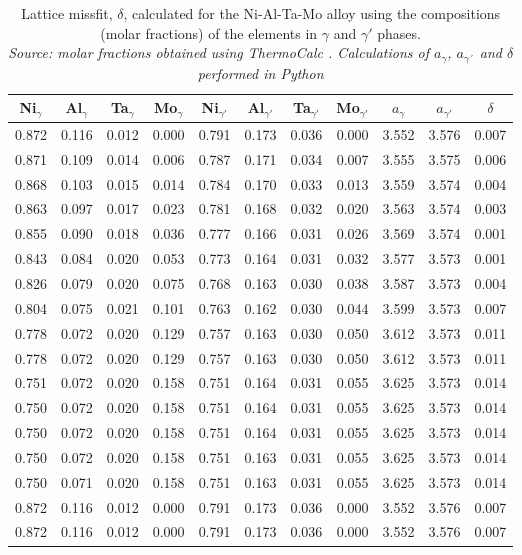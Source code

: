 \begin{table}[H]
    \centering
    \begin{tabular}{rrrrrrrrrrr}
        \multicolumn{1}{c}{Ni$_\gamma$} & \multicolumn{1}{c}{Al$_\gamma$} & \multicolumn{1}{c}{Ta$_\gamma$} & \multicolumn{1}{c}{Mo$_\gamma$} & \multicolumn{1}{c}{Ni$_{\gamma'}$} & \multicolumn{1}{c}{Al$_{\gamma'}$} & \multicolumn{1}{c}{Ta$_{\gamma'}$} & \multicolumn{1}{c}{Mo$_{\gamma'}$} & \multicolumn{1}{c}{$a_\gamma$} & \multicolumn{1}{c}{$a_{\gamma'}$} & \multicolumn{1}{c}{$\delta$} \\ \hline \hline
        0.872 & 0.116 & 0.012 & 0.000 & 0.791 & 0.173 & 0.036 & 0.000 & 3.552 & 3.576 & 0.007 \\0.871 & 0.109 & 0.014 & 0.006 & 0.787 & 0.171 & 0.034 & 0.007 & 3.555 & 3.575 & 0.006 \\0.868 & 0.103 & 0.015 & 0.014 & 0.784 & 0.170 & 0.033 & 0.013 & 3.559 & 3.574 & 0.004 \\0.863 & 0.097 & 0.017 & 0.023 & 0.781 & 0.168 & 0.032 & 0.020 & 3.563 & 3.574 & 0.003 \\0.855 & 0.090 & 0.018 & 0.036 & 0.777 & 0.166 & 0.031 & 0.026 & 3.569 & 3.574 & 0.001 \\0.843 & 0.084 & 0.020 & 0.053 & 0.773 & 0.164 & 0.031 & 0.032 & 3.577 & 3.573 & 0.001 \\0.826 & 0.079 & 0.020 & 0.075 & 0.768 & 0.163 & 0.030 & 0.038 & 3.587 & 3.573 & 0.004 \\0.804 & 0.075 & 0.021 & 0.101 & 0.763 & 0.162 & 0.030 & 0.044 & 3.599 & 3.573 & 0.007 \\0.778 & 0.072 & 0.020 & 0.129 & 0.757 & 0.163 & 0.030 & 0.050 & 3.612 & 3.573 & 0.011 \\0.778 & 0.072 & 0.020 & 0.129 & 0.757 & 0.163 & 0.030 & 0.050 & 3.612 & 3.573 & 0.011 \\0.751 & 0.072 & 0.020 & 0.158 & 0.751 & 0.164 & 0.031 & 0.055 & 3.625 & 3.573 & 0.014 \\0.750 & 0.072 & 0.020 & 0.158 & 0.751 & 0.164 & 0.031 & 0.055 & 3.625 & 3.573 & 0.014 \\0.750 & 0.072 & 0.020 & 0.158 & 0.751 & 0.164 & 0.031 & 0.055 & 3.625 & 3.573 & 0.014 \\0.750 & 0.072 & 0.020 & 0.158 & 0.751 & 0.163 & 0.031 & 0.055 & 3.625 & 3.573 & 0.014 \\0.750 & 0.071 & 0.020 & 0.158 & 0.751 & 0.163 & 0.031 & 0.055 & 3.625 & 3.573 & 0.014 \\0.872 & 0.116 & 0.012 & 0.000 & 0.791 & 0.173 & 0.036 & 0.000 & 3.552 & 3.576 & 0.007 \\0.872 & 0.116 & 0.012 & 0.000 & 0.791 & 0.173 & 0.036 & 0.000 & 3.552 & 3.576 & 0.007
    \end{tabular}
    \caption{\centering Lattice missfit, $\delta$, calculated for the Ni-Al-Ta-Mo alloy using the compositions (molar fractions) of the elements in $\gamma$ and $\gamma'$ phases.\\
    \textit{Source: molar fractions obtained using ThermoCalc \citep{thermocalc}. Calculations of $a_\gamma$, $a_{\gamma´}$ and $\delta$ performed in Python \citep{mygit}}}
    \label{tab:tab09}
\end{table}


